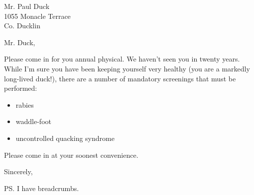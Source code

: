 \documentclass{letter}
\begin{document}
\begin{letter}{%
    Mr\@. Paul Duck \\
    1055 Monacle Terrace \\
    Co\@. Ducklin}
  
\opening{Mr\@. Duck,}

Please come in for you annual physical.  We haven't seen you in twenty
years.  While I'm sure you have been keeping yourself very healthy
(you are a markedly long-lived duck!), there are a number of mandatory
screenings that must be performed:
\begin{itemize}
\item rabies
\item waddle-foot
\item uncontrolled quacking syndrome
\end{itemize}
Please come in at your soonest convenience.

\closing{Sincerely,}
\ps{I have breadcrumbs.}
\end{letter}
\end{document}
